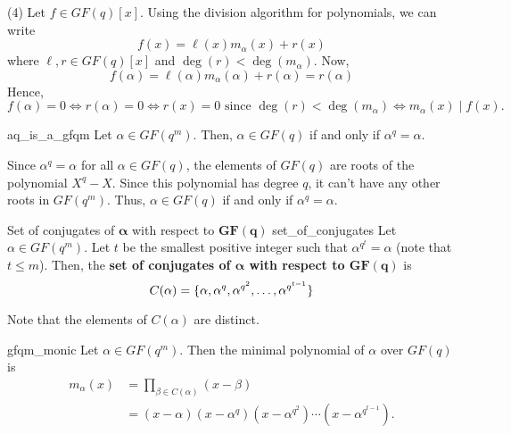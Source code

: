 \begin{Proof}{ (4)}{}
    Let $ f\in GF(q)[x] $. Using the division algorithm for polynomials,
    we can write
    \[ f(x)=\ell(x)m_\alpha(x)+r(x) \]
    where $ \ell,r\in GF(q)[x] $ and $ \deg(r)<\deg(m_\alpha) $. Now,
    \[ f(\alpha)=\ell(\alpha)m_\alpha(\alpha)+r(\alpha)=r(\alpha) \]
    Hence,
    \[ f(\alpha)=0\iff r(\alpha)=0\iff r(x)=0 \text{ since }\deg(r)<\deg(m_\alpha)\iff
        m_\alpha(x)\mid f(x). \]
\end{Proof}

\begin{Theorem}{}{aq_is_a_gfqm}
    Let $ \alpha\in GF(q^m) $. Then, $ \alpha\in GF(q) $ if and only if
    $ \alpha^q=\alpha $.
\end{Theorem}

\begin{Proof}{}{}
    Since $ \alpha^q=\alpha $ for all $ \alpha\in GF(q) $, the elements of $ GF(q) $
    are roots of the polynomial $ X^q-X $. Since this polynomial has degree $ q $,
    it can't have any other roots in $ GF(q^m) $. Thus, $ \alpha\in GF(q) $
    if and only if $ \alpha^q=\alpha $.
\end{Proof}

\begin{Definition}{Set of conjugates of $ \symbf{\alpha} $ with respect to $ \symbf{GF(q)} $}{
        set_of_conjugates
    }
    Let $ \alpha\in GF(q^m) $. Let $ t $ be the smallest positive integer such that
    $ \alpha^{q^t}=\alpha $ (note that $ t\leqslant m $). Then, the
    \textbf{set of conjugates of $ \symbf{\alpha} $ with respect to $ \symbf{GF(q)} $} is
    \[ C(\alpha)=\{\alpha,\alpha^q,\alpha^{q^2},\ldots,\alpha^{q^{t-1}}\} \]

    Note that the elements of $ C(\alpha) $ are distinct.
\end{Definition}

\begin{Theorem}{}{gfqm_monic}
    Let $ \alpha\in GF(q^m) $. Then the minimal polynomial of $ \alpha $ over
    $ GF(q) $ is
    \begin{align*}
        m_\alpha(x)
         & =\prod_{\beta\in C(\alpha)}(x-\beta)                               \\
         & =(x-\alpha)(x-\alpha^q)(x-\alpha^{q^2})\cdots(x-\alpha^{q^{t-1}}).
    \end{align*}
\end{Theorem}

